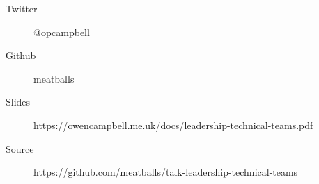 

\begin{frame}{}
  \begin{description}
    \item [Twitter] @opcampbell
    \item [Github] meatballs
  \end{description}
  \vfill
  \begin{description}
    \item [Slides] {\small https://owencampbell.me.uk/docs/leadership-technical-teams.pdf}
    \item [Source] {\small https://github.com/meatballs/talk-leadership-technical-teams}
  \end{description}

\end{frame}
